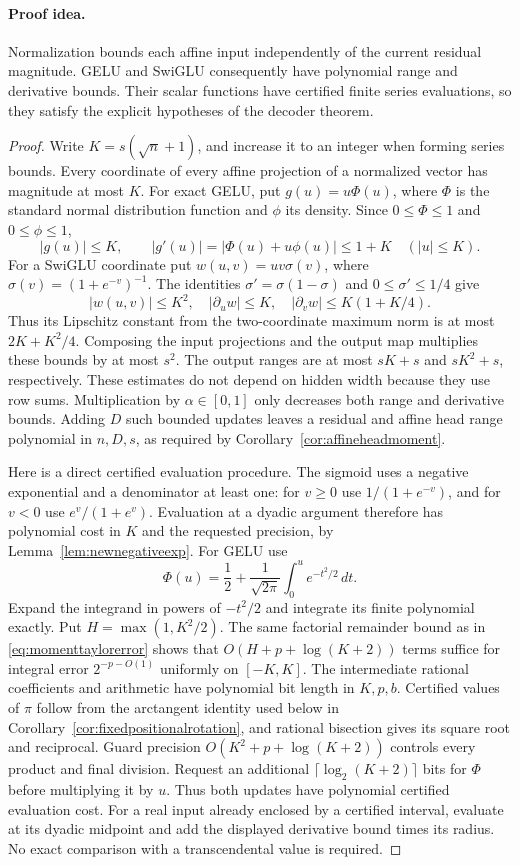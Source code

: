 \paragraph{Proof idea.}
Normalization bounds each affine input independently of the
current residual magnitude.  GELU and SwiGLU consequently
have polynomial range and derivative bounds.  Their scalar
functions have certified finite series evaluations, so they
satisfy the explicit hypotheses of the decoder theorem.

\begin{proof}
Write $K=s(\sqrt n+1)$, and increase it to an integer when
forming series bounds.  Every coordinate of every affine
projection of a normalized vector has magnitude at most $K$.
For exact GELU, put $g(u)=u\Phi(u)$, where $\Phi$ is the
standard normal distribution function and $\phi$ its density.
Since $0\le\Phi\le1$ and $0\le\phi\le1$,
\[
 |g(u)|\le K,\qquad
 |g'(u)|=|\Phi(u)+u\phi(u)|\le1+K
 \quad (|u|\le K).
\]
For a SwiGLU coordinate put $w(u,v)=u v\sigma(v)$, where
$\sigma(v)=(1+e^{-v})^{-1}$.  The identities
$\sigma'=\sigma(1-\sigma)$ and $0\le\sigma'\le1/4$ give
\[
 |w(u,v)|\le K^2,\quad
 |\partial_u w|\le K,\quad
 |\partial_v w|\le K(1+K/4).
\]
Thus its Lipschitz constant from the two-coordinate maximum
norm is at most $2K+K^2/4$.  Composing the input projections
and the output map multiplies these bounds by at most $s^2$.
The output ranges are at most $sK+s$ and $sK^2+s$,
respectively.  These estimates do not depend on hidden width
because they use row sums.  Multiplication by
$\alpha\in[0,1]$ only decreases both range and derivative bounds.
Adding $D$ such bounded updates leaves a residual and affine
head range polynomial in $n,D,s$, as required by
Corollary~\ref{cor:affineheadmoment}.

Here is a direct certified evaluation procedure.  The sigmoid
uses a negative exponential and a denominator at least one:
for $v\ge0$ use $1/(1+e^{-v})$, and for $v<0$ use
$e^v/(1+e^v)$.  Evaluation at a dyadic argument therefore has
polynomial cost in $K$ and the requested precision, by
Lemma~\ref{lem:newnegativeexp}.  For GELU use
\[
 \Phi(u)=\frac12+\frac1{\sqrt{2\pi}}
                  \int_0^u e^{-t^2/2}\,dt.
\]
Expand the integrand in powers of $-t^2/2$ and integrate its
finite polynomial exactly.  Put $H=\max(1,K^2/2)$.  The same
factorial remainder bound as in
\eqref{eq:momenttaylorerror} shows that
$O(H+p+\log(K+2))$ terms suffice for integral error
$2^{-p-O(1)}$ uniformly on $[-K,K]$.
The intermediate rational coefficients and arithmetic have
polynomial bit length in $K,p,b$.  Certified values of
$\pi$ follow from the arctangent identity used below in
Corollary~\ref{cor:fixedpositionalrotation}, and rational
bisection gives its square root and reciprocal.  Guard
precision $O(K^2+p+\log(K+2))$ controls every product and
final division.  Request an additional $\lceil\log_2(K+2)\rceil$ bits for
$\Phi$ before multiplying it by $u$.  Thus both updates have
polynomial certified evaluation cost.  For a real input already enclosed by a
certified interval, evaluate at its dyadic midpoint and add
the displayed derivative bound times its radius.  No exact
comparison with a transcendental value is required.


\end{proof}
